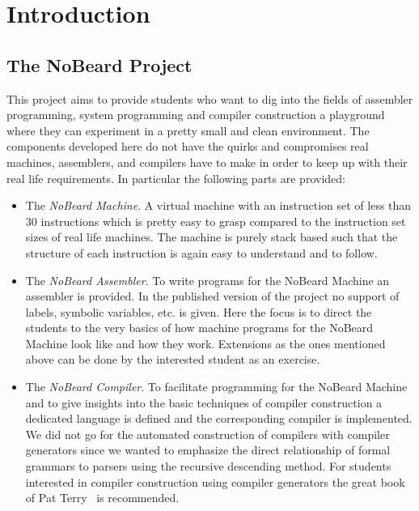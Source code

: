 \documentclass[11pt]{report}
\newcommand{\leongage}{NoBeard}
\begin{document}
\pagebreak

\tableofcontents
\chapter{Introduction}
\section{The \leongage{} Project}
This project aims to provide students who want to dig into the fields of assembler programming, system programming and compiler construction a playground where they can experiment in a pretty small and clean environment. The components developed here do not have the quirks and compromises real machines, assemblers, and compilers have to make in order to keep up with their real life requirements. In particular the following parts are provided:

\begin{itemize}
	\item The {\em \leongage{} Machine}. A virtual machine with an instruction set of less than 30 instructions which is pretty easy to grasp compared to the instruction set sizes of real life machines. The machine is purely stack based such that the structure of each instruction is again easy to understand and to follow.
	\item The {\em \leongage{} Assembler}. To write programs for the \leongage{} Machine an assembler is provided. In the published version of the project no support of labels, symbolic variables, etc. is given. Here the focus is to direct the students to the very basics of how machine programs for the \leongage{} Machine look like and how they work. Extensions as the ones mentioned above can be done by the interested student as an exercise.
	\item The {\em \leongage{} Compiler}. To facilitate programming for the \leongage{} Machine and to give insights into the basic techniques of compiler construction a dedicated language is defined and the corresponding compiler is implemented. We did not go for the automated construction of compilers with compiler generators since we wanted to emphasize the direct relationship of formal grammars to parsers using the recursive descending method. For students interested in compiler construction using compiler generators the great book of Pat Terry~\cite{terry_compiling_2004} is recommended.
\end{itemize}
\end{document}

